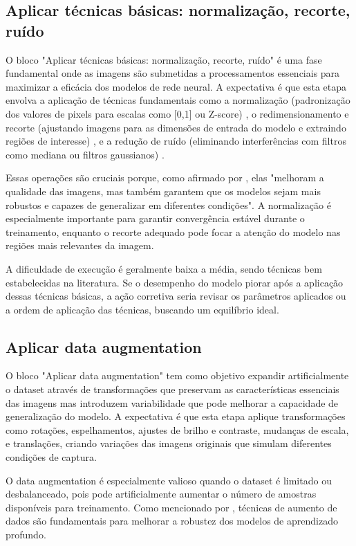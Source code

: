 \subsection{Aplicar técnicas básicas: normalização, recorte, ruído}
O bloco "Aplicar técnicas básicas: normalização, recorte, ruído" é uma fase fundamental onde as imagens são submetidas a processamentos essenciais para maximizar a eficácia dos modelos de rede neural. A expectativa é que esta etapa envolva a aplicação de técnicas fundamentais como a normalização (padronização dos valores de pixels para escalas como [0,1] ou Z-score) \cite{Sharma2024}, o redimensionamento e recorte (ajustando imagens para as dimensões de entrada do modelo e extraindo regiões de interesse) \cite{Sharma2024}, e a redução de ruído (eliminando interferências com filtros como mediana ou filtros gaussianos) \cite{Sharma2024}.

Essas operações são cruciais porque, como afirmado por , elas "melhoram a qualidade das imagens, mas também garantem que os modelos sejam mais robustos e capazes de generalizar em diferentes condições". A normalização é especialmente importante para garantir convergência estável durante o treinamento, enquanto o recorte adequado pode focar a atenção do modelo nas regiões mais relevantes da imagem.

A dificuldade de execução é geralmente baixa a média, sendo técnicas bem estabelecidas na literatura. Se o desempenho do modelo piorar após a aplicação dessas técnicas básicas, a ação corretiva seria revisar os parâmetros aplicados ou a ordem de aplicação das técnicas, buscando um equilíbrio ideal.

\subsection{Aplicar data augmentation}
O bloco "Aplicar data augmentation" tem como objetivo expandir artificialmente o dataset através de transformações que preservam as características essenciais das imagens mas introduzem variabilidade que pode melhorar a capacidade de generalização do modelo. A expectativa é que esta etapa aplique transformações como rotações, espelhamentos, ajustes de brilho e contraste, mudanças de escala, e translações, criando variações das imagens originais que simulam diferentes condições de captura.

O data augmentation é especialmente valioso quando o dataset é limitado ou desbalanceado, pois pode artificialmente aumentar o número de amostras disponíveis para treinamento. Como mencionado por , técnicas de aumento de dados são fundamentais para melhorar a robustez dos modelos de aprendizado profundo.

